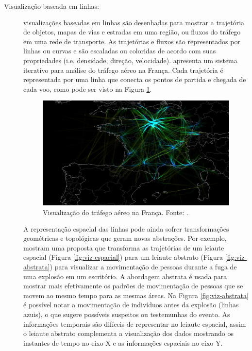 \begin{description}
  \item[Visualização baseada em linhas:] visualizações baseadas em linhas são
desenhadas para mostrar a trajetória de objetos, mapas de vias e estradas em
uma região, ou fluxos do tráfego em uma rede de transporte. As trajetórias e
fluxos são representados por linhas ou curvas e são escaladas ou coloridas de
acordo com suas propriedades (i.e. densidade, direção, velocidade).
\citet{Klein2014} apresenta um sistema iterativo para análise do tráfego aéreo
na França. Cada trajetória é representada por uma linha que conecta os pontos
de partida e chegada de cada voo, como pode ser visto na Figura
\ref{fig:air-traffic}.

\begin{figure}[!htb]
  \centering
  \includegraphics[width=1\textwidth]{../figuras/air-traffic.png}
  \caption[Visualização do tráfego aéreo na França]{Visualização do tráfego aéreo na França. Fonte: \citet{Klein2014}.}
  \label{fig:air-traffic}
\end{figure}

  A representação espacial das linhas pode ainda sofrer transformações
geométricas e topológicas que geram novas abstrações. Por exemplo,
\citet{Tarik2009} mostram uma proposta que transforma as trajetórias de um
leiaute espacial (Figura \ref{fig:viz-espacial}) para um leiaute abstrato
(Figura \ref{fig:viz-abstrata}) para visualizar a movimentação de pessoas
durante a fuga de uma explosão em um escritório.  A abordagem abstrata é usada
para mostrar mais efetivamente os padrões de movimentação de pessoas que se
movem ao mesmo tempo para as mesmas áreas. Na Figura \ref{fig:viz-abstrata} é
possível notar a movimentação de indivíduos antes da explosão (linhas azuis), o
que sugere possíveis suspeitos ou testemunhas do evento.  As informações
temporais são difíceis de representar no leiaute espacial, assim o leiaute
abstrato complementa a visualização dos dados mostrando os instantes de tempo
no eixo X e as informações espaciais no eixo Y.


\end{description}
